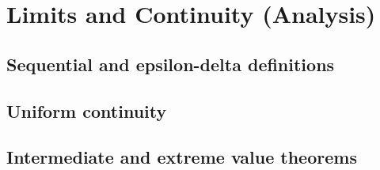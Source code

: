 
\section{Limits and Continuity (Analysis)}

\subsection{Sequential and epsilon-delta definitions}


\subsection{Uniform continuity}


\subsection{Intermediate and extreme value theorems}

